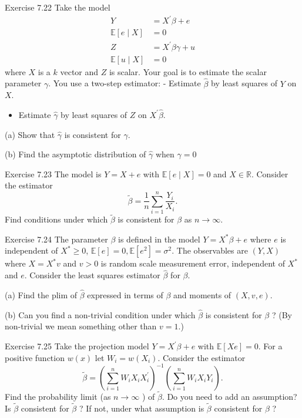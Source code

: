 \documentclass[10pt]{article}
\begin{document}
Exercise 7.22 Take the model
$$
\begin{aligned}
Y &=X^{\prime} \beta+e \\
\mathbb{E}[e \mid X] &=0 \\
Z &=X^{\prime} \beta \gamma+u \\
\mathbb{E}[u \mid X] &=0
\end{aligned}
$$
where $X$ is a $k$ vector and $Z$ is scalar. Your goal is to estimate the scalar parameter $\gamma$. You use a two-step estimator: - Estimate $\widehat{\beta}$ by least squares of $Y$ on $X$.

\begin{itemize}
  \item Estimate $\widehat{\gamma}$ by least squares of $Z$ on $X^{\prime} \widehat{\beta}$.
\end{itemize}
(a) Show that $\widehat{\gamma}$ is consistent for $\gamma$.

(b) Find the asymptotic distribution of $\widehat{\gamma}$ when $\gamma=0$

Exercise 7.23 The model is $Y=X+e$ with $\mathbb{E}[e \mid X]=0$ and $X \in \mathbb{R}$. Consider the estimator
$$
\widetilde{\beta}=\frac{1}{n} \sum_{i=1}^{n} \frac{Y_{i}}{X_{i}} .
$$
Find conditions under which $\widetilde{\beta}$ is consistent for $\beta$ as $n \rightarrow \infty$.

Exercise 7.24 The parameter $\beta$ is defined in the model $Y=X^{*} \beta+e$ where $e$ is independent of $X^{*} \geq 0$, $\mathbb{E}[e]=0, \mathbb{E}\left[e^{2}\right]=\sigma^{2}$. The observables are $(Y, X)$ where $X=X^{*} v$ and $v>0$ is random scale measurement error, independent of $X^{*}$ and $e$. Consider the least squares estimator $\widehat{\beta}$ for $\beta$.

(a) Find the plim of $\widehat{\beta}$ expressed in terms of $\beta$ and moments of $(X, v, e)$.

(b) Can you find a non-trivial condition under which $\widehat{\beta}$ is consistent for $\beta$ ? (By non-trivial we mean something other than $v=1$.)

Exercise 7.25 Take the projection model $Y=X^{\prime} \beta+e$ with $\mathbb{E}[X e]=0$. For a positive function $w(x)$ let $W_{i}=w\left(X_{i}\right)$. Consider the estimator
$$
\widetilde{\beta}=\left(\sum_{i=1}^{n} W_{i} X_{i} X_{i}^{\prime}\right)^{-1}\left(\sum_{i=1}^{n} W_{i} X_{i} Y_{i}\right) .
$$
Find the probability limit (as $n \rightarrow \infty$ ) of $\widetilde{\beta}$. Do you need to add an assumption? Is $\widetilde{\beta}$ consistent for $\widetilde{\beta}$ ? If not, under what assumption is $\widetilde{\beta}$ consistent for $\beta$ ?
\end{document}
